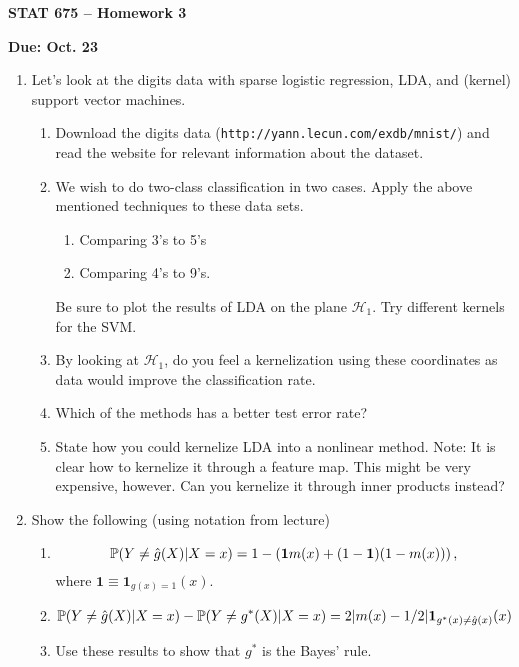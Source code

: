 \documentclass[11pt]{article}
\begin{document}
\baselineskip=13.2pt
\parindent=0pt
\parskip=13.2pt
\pagestyle{empty}

\renewcommand{\mu}{\textrm{mu}}
\newcommand{\sd}{\textrm{sd}}
\centerline{\bf \Large STAT 675 -- Homework 3}
\centerline{\bf \large Due: Oct. 23}
\begin{enumerate}
\item Let's look at the digits data with sparse logistic regression, 
LDA, and (kernel) support vector machines.

\begin{enumerate}
\item Download the digits data ({\tt http://yann.lecun.com/exdb/mnist/}) and 
read the website for relevant information about the dataset.

\item We wish to do two-class classification in two cases.  Apply the above mentioned 
techniques to these data sets.  
\begin{enumerate}
\item Comparing 3's to 5's 
\item Comparing 4's to 9's.  
\end{enumerate}
Be sure to plot the results of LDA on the plane $\mathcal{H}_1$.  Try different
kernels for the SVM.
\item By looking at  $\mathcal{H}_1$, do you feel a kernelization using these
coordinates as data would improve the classification rate.
\item Which of the methods has a better test error rate?
\item State how you could kernelize LDA into a nonlinear method.  Note: 
It is clear how to kernelize it through a feature map.  This might be very expensive,
however.  Can you kernelize it through inner products instead?
\end{enumerate}

\item Show the following (using notation from lecture)
\begin{enumerate}
\item 
\[
\P(Y \neq \hat{g}(X) | X = x)
= 
1- \left(\mathbf{1}m(x) + (1-\mathbf{1})(1-m(x))\right),
\]
where $\mathbf{1} \equiv \mathbf{1}_{g(x) = 1}(x)$.
\item 
\begin{align*}
\P(Y \neq \hat{g}(X) | X = x) - \P(Y \neq g^*(X) | X = x) 
& =  2|m(x) - 1/2|\mathbf{1}_{g^*(x)\neq \hat{g}(x) }(x) 
\end{align*}
\item Use these results to show that $g^*$ is the Bayes' rule.
\end{enumerate}

\end{enumerate}
\end{document}
